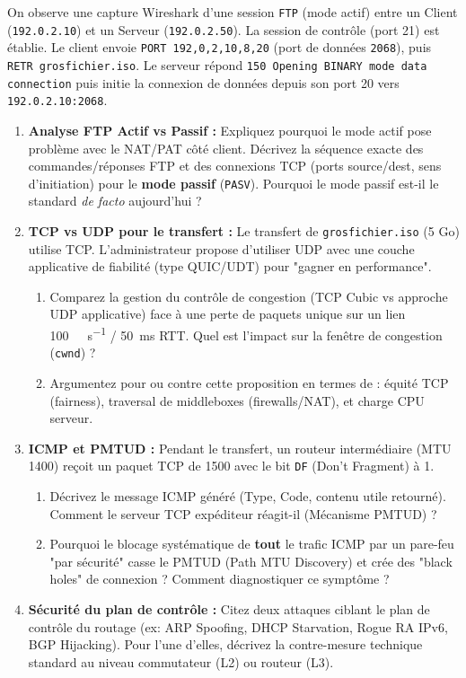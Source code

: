 \documentclass[11pt]{article}
\begin{document}
\begin{exercice}
On observe une capture Wireshark d'une session \texttt{FTP} (mode actif) entre un Client (\texttt{192.0.2.10}) et un Serveur (\texttt{192.0.2.50}). La session de contrôle (port 21) est établie. Le client envoie \texttt{PORT 192,0,2,10,8,20} (port de données \texttt{2068}), puis \texttt{RETR grosfichier.iso}. Le serveur répond \texttt{150 Opening BINARY mode data connection} puis initie la connexion de données depuis son port 20 vers \texttt{192.0.2.10:2068}.
\begin{enumerate}
    \item \textbf{Analyse FTP Actif vs Passif :} Expliquez pourquoi le mode actif pose problème avec le NAT/PAT côté client. Décrivez la séquence exacte des commandes/réponses FTP et des connexions TCP (ports source/dest, sens d'initiation) pour le \textbf{mode passif} (\texttt{PASV}). Pourquoi le mode passif est-il le standard \textit{de facto} aujourd'hui ?
    \item \textbf{TCP vs UDP pour le transfert :} Le transfert de \texttt{grosfichier.iso} (5 Go) utilise TCP. L'administrateur propose d'utiliser UDP avec une couche applicative de fiabilité (type QUIC/UDT) pour "gagner en performance".
        \begin{enumerate}
            \item Comparez la gestion du contrôle de congestion (TCP Cubic vs approche UDP applicative) face à une perte de paquets unique sur un lien \SI{100}{\mega\bit\per\second} / \SI{50}{\milli\second} RTT. Quel est l'impact sur la fenêtre de congestion (\texttt{cwnd}) ?
            \item Argumentez pour ou contre cette proposition en termes de : équité TCP (fairness), traversal de middleboxes (firewalls/NAT), et charge CPU serveur.
        \end{enumerate}
    \item \textbf{ICMP et PMTUD :} Pendant le transfert, un routeur intermédiaire (MTU \SI{1400}{\byte}) reçoit un paquet TCP de \SI{1500}{\byte} avec le bit \texttt{DF} (Don't Fragment) à 1.
        \begin{enumerate}
            \item Décrivez le message ICMP généré (Type, Code, contenu utile retourné). Comment le serveur TCP expéditeur réagit-il (Mécanisme PMTUD) ?
            \item Pourquoi le blocage systématique de \textbf{tout} le trafic ICMP par un pare-feu "par sécurité" casse le PMTUD (Path MTU Discovery) et crée des "black holes" de connexion ? Comment diagnostiquer ce symptôme ?
        \end{enumerate}
    \item \textbf{Sécurité du plan de contrôle :} Citez deux attaques ciblant le plan de contrôle du routage (ex: ARP Spoofing, DHCP Starvation, Rogue RA IPv6, BGP Hijacking). Pour l'une d'elles, décrivez la contre-mesure technique standard au niveau commutateur (L2) ou routeur (L3).
\end{enumerate}
\end{exercice}
\end{document}
